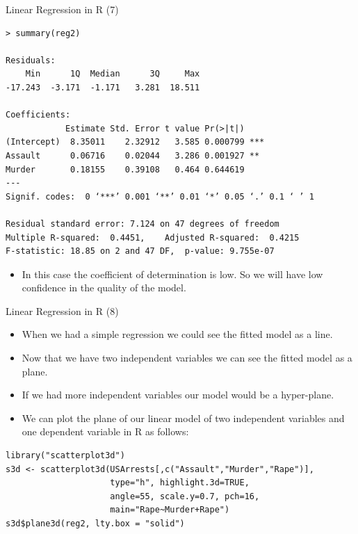 \documentclass[handout]{beamer}
\begin{document}
\begin{frame}[fragile]{Linear Regression in R (7)}
\scriptsize{

\begin{verbatim}
> summary(reg2)

Residuals:
    Min      1Q  Median      3Q     Max 
-17.243  -3.171  -1.171   3.281  18.511 

Coefficients:
            Estimate Std. Error t value Pr(>|t|)    
(Intercept)  8.35011    2.32912   3.585 0.000799 ***
Assault      0.06716    0.02044   3.286 0.001927 ** 
Murder       0.18155    0.39108   0.464 0.644619    
---
Signif. codes:  0 ‘***’ 0.001 ‘**’ 0.01 ‘*’ 0.05 ‘.’ 0.1 ‘ ’ 1

Residual standard error: 7.124 on 47 degrees of freedom
Multiple R-squared:  0.4451,	Adjusted R-squared:  0.4215 
F-statistic: 18.85 on 2 and 47 DF,  p-value: 9.755e-07

\end{verbatim}

\begin{itemize}
\item In this case the coefficient of determination is low. So we will have low confidence in the quality of the model.
 \end{itemize}
 

} 
\end{frame}

\begin{frame}[fragile]{Linear Regression in R (8)}
\scriptsize{
\begin{itemize}
 \item When we had a simple regression we could see the fitted model as a line.
 \item Now that we have two independent variables we can see the fitted model as a plane.
 \item If we had more independent variables our model would be a hyper-plane.
 \item We can plot the plane of our linear model of two independent variables and one dependent variable in R as follows:
 \end{itemize}

\begin{verbatim}
library("scatterplot3d")
s3d <- scatterplot3d(USArrests[,c("Assault","Murder","Rape")],
                     type="h", highlight.3d=TRUE,
                     angle=55, scale.y=0.7, pch=16, 
                     main="Rape~Murder+Rape")
s3d$plane3d(reg2, lty.box = "solid")

\end{verbatim}




} 
\end{frame}
\end{document}
